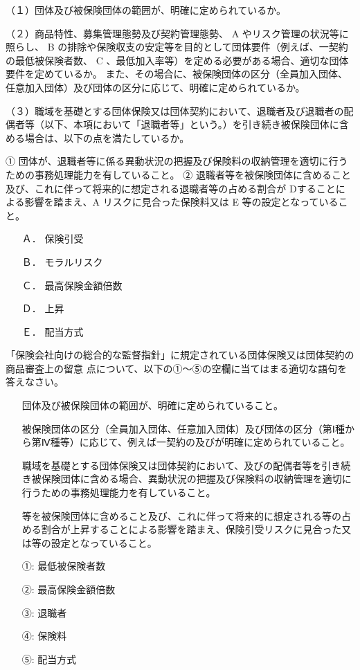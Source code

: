 \documentclass[report,gutter=10mm,fore-edge=10mm,uplatex,dvipdfmx]{jlreq}
\begin{document}
（１）団体及び被保険団体の範囲が、明確に定められているか。

（２）商品特性、募集管理態勢及び契約管理態勢、 A やリスク管理の状況等に照らし、 B
の排除や保険収支の安定等を目的として団体要件（例えば、一契約の最低被保険者数、 C
、最低加入率等）を定める必要がある場合、適切な団体要件を定めているか。
また、その場合に、被保険団体の区分（全員加入団体、任意加入団体）及び団体の区分に応じて、明確に定められているか。

（３）職域を基礎とする団体保険又は団体契約において、退職者及び退職者の配偶者等（以下、本項において「退職者等」という。）を引き続き被保険団体に含める場合は、以下の点を満たしているか。

① 団体が、退職者等に係る異動状況の把握及び保険料の収納管理を適切に行うための事務処理能力を有していること。
② 退職者等を被保険団体に含めること及び、これに伴って将来的に想定される退職者等の占める割合が
Dすることによる影響を踏まえ、A リスクに見合った保険料又は E 等の設定となっていること。

\answer{}
\begin{itemize}
\item[ Ａ．] 保険引受 
\item[ Ｂ．] モラルリスク 
\item[ Ｃ．] 最高保険金額倍数 
\item[ Ｄ．] 上昇
\item[ Ｅ．] 配当方式
\end{itemize}

「保険会社向けの総合的な監督指針」に規定されている団体保険又は団体契約の商品審査上の留意
点について、以下の①～⑤の空欄に当てはまる適切な語句を答えなさい。

\begin{itemize}
\item[] 団体及び被保険団体の範囲が、明確に定められていること。
\item[] 被保険団体の区分（全員加入団体、任意加入団体）及び団体の区分（第Ⅰ種から第Ⅳ種等）に応じて、例えば一契約の及びが明確に定められていること。
\item[] 職域を基礎とする団体保険又は団体契約において、及びの配偶者等を引き続き被保険団体に含める場合、異動状況の把握及び保険料の収納管理を適切に行うための事務処理能力を有していること。
\item[]  等を被保険団体に含めること及び、これに伴って将来的に想定される等の占める割合が上昇することによる影響を踏まえ、保険引受リスクに見合った又は等の設定となっていること。
\end{itemize}

\answer{}
\begin{itemize}
\item[ ①: ] 最低被保険者数
\item[ ②: ] 最高保険金額倍数
\item[ ③: ] 退職者
\item[ ④: ] 保険料
\item[ ⑤: ] 配当方式
\end{itemize}

\end{document}
